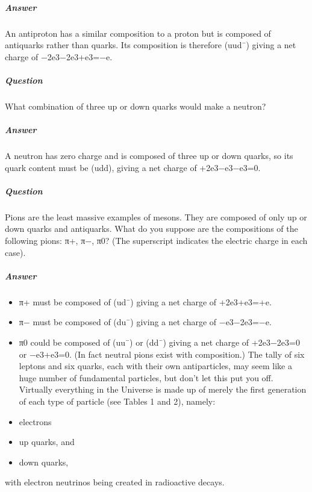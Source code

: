 \documentclass[letterpaper,10pt,english]{sphinxmanual}
\begin{document}
\subparagraph{Answer}
\label{\detokenize{content/session_00/Part_00_04:Answer}}
An antiproton has a similar composition to a proton but is composed of antiquarks rather than quarks. Its composition is therefore (uud¯) giving a net charge of −2e3−2e3+e3=−e.


\subparagraph{Question}
\label{\detokenize{content/session_00/Part_00_04:id2}}
What combination of three up or down quarks would make a neutron?


\subparagraph{Answer}
\label{\detokenize{content/session_00/Part_00_04:id3}}
A neutron has zero charge and is composed of three up or down quarks, so its quark content must be (udd), giving a net charge of +2e3−e3−e3=0.


\subparagraph{Question}
\label{\detokenize{content/session_00/Part_00_04:id4}}
Pions are the least massive examples of mesons. They are composed of only up or down quarks and antiquarks. What do you suppose are the compositions of the following pions: π+, π−, π0? (The superscript indicates the electric charge in each case).


\subparagraph{Answer}
\label{\detokenize{content/session_00/Part_00_04:id5}}\begin{itemize}
\item {} 
π+ must be composed of (ud¯) giving a net charge of +2e3+e3=+e.

\item {} 
π− must be composed of (du¯) giving a net charge of −e3−2e3=−e.

\item {} 
π0 could be composed of (uu¯) or (dd¯) giving a net charge of +2e3−2e3=0 or −e3+e3=0. (In fact neutral pions exist with  composition.) The tally of six leptons and six quarks, each with their own antiparticles, may seem like a huge number of fundamental particles, but don’t let this put you off. Virtually everything in the Universe is made up of merely the first generation of each type of particle (see Tables 1 and 2), namely:

\item {} 
electrons

\item {} 
up quarks, and

\item {} 
down quarks,

\end{itemize}

with electron neutrinos being created in radioactive decays.
\end{document}
